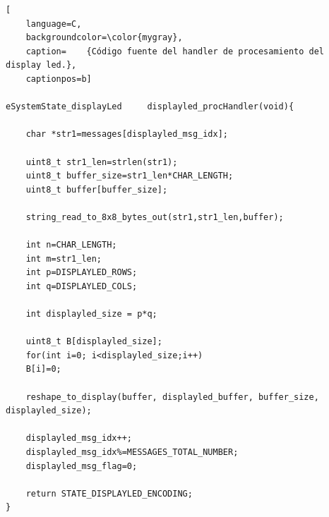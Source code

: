\begin{lstlisting}[
	language=C, 
	backgroundcolor=\color{mygray},
	caption=	{Código fuente del handler de procesamiento del display led.},
	captionpos=b]

eSystemState_displayLed     displayled_procHandler(void){

    char *str1=messages[displayled_msg_idx];

    uint8_t str1_len=strlen(str1);
    uint8_t buffer_size=str1_len*CHAR_LENGTH;
    uint8_t buffer[buffer_size];

    string_read_to_8x8_bytes_out(str1,str1_len,buffer);

    int n=CHAR_LENGTH; 
    int m=str1_len;
    int p=DISPLAYLED_ROWS;
    int q=DISPLAYLED_COLS;

    int displayled_size = p*q;

    uint8_t B[displayled_size];
    for(int i=0; i<displayled_size;i++)
    B[i]=0;

    reshape_to_display(buffer, displayled_buffer, buffer_size, displayled_size);

    displayled_msg_idx++;
    displayled_msg_idx%=MESSAGES_TOTAL_NUMBER;
    displayled_msg_flag=0;

    return STATE_DISPLAYLED_ENCODING;
}

\end{lstlisting}


